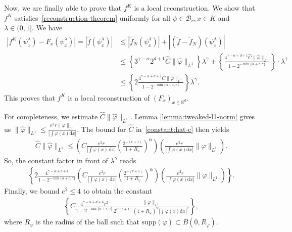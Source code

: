 Now, we are finally able to prove that \(f^K\) is a local reconstruction. We show that \(f^K\) satisfies~\eqref{reconstruction-theorem} uniformly for all \(\psi \in \mathcal{B}_r, x \in K\) and \(\lambda \in (0,1]\). We have
\begin{align*}
    |f^K(\psi^\lambda_x) - F_x(\psi^\lambda_x)| = |\tilde f (\psi^\lambda_x)| 
    &\leq  |\tilde f_N (\psi^\lambda_x)| + |(\tilde f - \tilde f_N) (\psi^\lambda_x)| \\
    &\leq \left \{ 3^{\gamma - \alpha} 2^{d+1} \hat C  \lVert \hat \varphi\rVert_{L^1} \right \} \lambda^\gamma +  \left\{ \frac{ 4^{\gamma - \alpha + d + 1} \hat C \lVert \hat \varphi \rVert_{L^1} }{1-2^{-\min\{\alpha + r, \gamma\}}} \right\}\cdot \lambda^{\gamma}  \\
    &\leq  \left\{2\frac{  4^{\gamma - \alpha + d + 1} \hat C \lVert \hat \varphi \rVert_{L^1}}{1-2^{-\min\{\alpha + r, \gamma\}}} \right\} \lambda^{\gamma}.
\end{align*}
This proves that \(f^K\) is a local reconstruction of \((F_x)_{x \in \mathbb{R}^d}\).

For completeness, we estimate \(\hat C \lVert \hat \varphi \rVert_{L^1}\). Lemma \ref{lemma:tweaked-l1-norm} gives us \(\lVert \hat \varphi \rVert_{L^1} \leq \frac{e^2 r \lVert \varphi \rVert_{L^1}}{|\int \varphi(x) \mathrm{d}x |} \). The bound for \(\hat C\) in~\eqref{constant:hat-c} then yields 
\begin{align}\label{chatnorml1}
    \hat C \lVert \hat \varphi \rVert_{L^1} \leq \left(C\frac{e^2 r}{|\int \varphi(x)\, \mathrm{d}x|} \left(\frac{2^{-(r+1)}}{1+R_\varphi}\right)^\alpha\right)\left( \frac{e^2 r}{|\int \varphi(x) \mathrm{d}x |} \lVert \varphi \rVert_{L^1}\right).
\end{align}
So, the constant factor in front of \(\lambda^\gamma\) reads 
\begin{align*}
    \left\{2\frac{  4^{\gamma - \alpha + d + 1}}{1-2^{-\min\{\alpha + r, \gamma\}}} \left(C\frac{e^2 r}{|\int \varphi(x)\, \mathrm{d}x|} \left(\frac{2^{-(r+1)}}{1+R_\varphi}\right)^\alpha\right) \left(\frac{e^2 r}{|\int \varphi(x) \mathrm{d}x |} \lVert \varphi \rVert_{L^1}\right) \right\}.
\end{align*}
Finally, we bound \(e^2 \leq 4\) to obtain the constant
\begin{align}\label{constant:rec-gamma-bigger-zero}
    \left\{C\frac{  4^{\gamma - \alpha + d + 6}r^2}{1-2^{-\min\{\alpha + r, \gamma\}}} \frac{\lVert \varphi \rVert_{L^1}}{2^{\alpha(r+1)} (1+R_\varphi)^{\alpha}|\int \varphi(x) \mathrm{d}x |^2}  \right\},
\end{align} 
where \(R_\varphi\) is the radius of the ball such that \(\mathrm{supp}(\varphi) \subset B(0, R_\varphi)\).  



